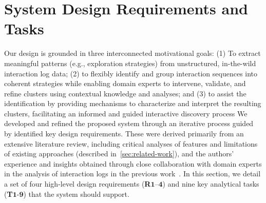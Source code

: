 \documentclass[preprint,journal]{vgtc}            %
\begin{document}
\section{System Design Requirements and Tasks}

Our design is grounded in three interconnected motivational goals: (1) To extract meaningful patterns (e.g., exploration strategies) from unstructured, in-the-wild interaction log data;
(2) to flexibly identify and group interaction sequences into coherent strategies while enabling domain experts to intervene, validate, and refine clusters using contextual knowledge and analyses; and
(3) to assist the identification by providing mechanisms to characterize and interpret the resulting clusters, facilitating an informed and guided interactive discovery process
We developed and refined the proposed system through an iterative process guided by identified key design requirements. 
These were derived primarily from an extensive literature review, including critical analyses of features and limitations of existing approaches (described in~\cref{sec:related-work}), and the authors' experience and insights obtained through close collaboration with domain experts in the analysis of interaction logs in the previous work~\cite{Yu25Revealing}.
In this section, we detail a set of four high-level design requirements (\textbf{R}$\mathbf{1}$--$\mathbf{4}$) and nine key analytical tasks (\textbf{T}$\mathbf{1}$-$\mathbf{9}$) that the system should support.
\end{document}
